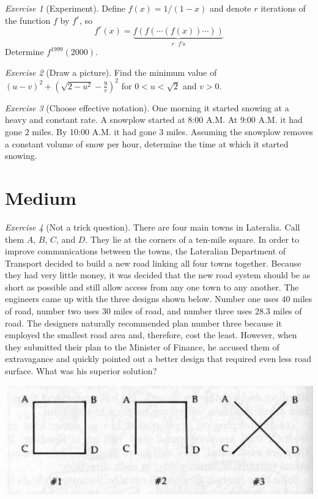 \documentclass{article}
\theoremstyle{definition}
\theoremstyle{remark}
\newtheorem{exercise}{Exercise}
\begin{document}
\begin{exercise}[Experiment]
Define $f(x)=1/(1-x)$ and denote $r$ iterations of the function $f$ by $f^r$, so \[f^r(x)=\underbrace{f(f(\cdots(f(x))\cdots))}_{r\text{ $f$'s}} \] Determine $f^{1999}(2000)$.
\end{exercise}

\begin{exercise}[Draw a picture]
Find the minimum value of $(u-v)^2+(\sqrt{2-u^2}-\frac{9}{v})^2$ for $0<u<\sqrt{2}$ and $v>0$.
\end{exercise}

\begin{exercise}[Choose effective notation]
One morning it started snowing at a heavy and constant rate. A snowplow started at 8:00 A.M. At 9:00 A.M. it had gone $2$ miles. By 10:00 A.M. it had gone $3$ miles. Assuming the snowplow removes a constant volume of snow per hour, determine the time at which it started snowing.
\end{exercise}

\section{Medium}

\begin{exercise}[Not a trick question]
There are four main towns in Lateralia. Call them $A$, $B$, $C$, and $D$. They lie at the corners of a ten-mile square. In order to improve communications between the towns, the Lateralian Department of Transport decided to build a new road linking all four towns together. Because they had very little money, it was decided that the new road system should be as short as possible and still allow access from any one town to any another. The engineers came up with the three designs shown below. Number one uses $40$ miles of road, number two uses $30$ miles of road, and number three uses $28.3$ miles of road. The designers naturally recommended plan number three because it employed the smallest road area and, therefore, cost the least. However, when they submitted their plan to the Minister of Finance, he accused them of extravagance and quickly pointed out a better design that required even less road surface. What was his superior solution?

\begin{center}
\includegraphics[scale=0.5]{Pics/pic1.png}
\end{center}
\end{exercise}
\end{document}
